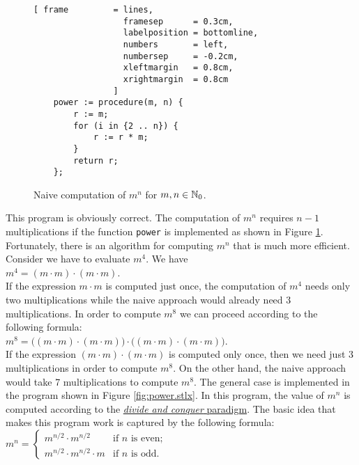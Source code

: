 \begin{figure}[!h]
  \centering
\begin{Verbatim}[ frame         = lines, 
                  framesep      = 0.3cm, 
                  labelposition = bottomline,
                  numbers       = left,
                  numbersep     = -0.2cm,
                  xleftmargin   = 0.8cm,
                  xrightmargin  = 0.8cm
                ]
    power := procedure(m, n) {
        r := m;
        for (i in {2 .. n}) {
            r := r * m;
        }
        return r;
    };
\end{Verbatim}
\vspace*{-0.3cm}
  \caption{Naive computation of $m^n$ for  $m,n \in {\mathbb N}_0$.}
  \label{fig:power-naive.stlx}
\end{figure} 

This program is obviously correct.  The computation of $m^n$ requires $n-1$ multiplications if the
function \texttt{power}  is implemented as shown in Figure \ref{fig:power-naive.stlx}.
Fortunately, there is an algorithm for computing $m^n$ that is much more efficient.
Consider we have to evaluate $m^4$.  We have
 \\[0.2cm]
\hspace*{1.3cm} 
$m^4 = (m \cdot m) \cdot (m \cdot m)$.
\\[0.2cm]
If the expression $m\cdot m$ is computed just once, the computation of
$m^4$ needs only two multiplications while the naive approach would already need 3 multiplications.
In order to compute $m^8$ we can proceed according to the following formula: \\[0.2cm]
\hspace*{1.3cm} 
$m^8 = \bigl( (m \cdot m) \cdot (m \cdot m) \bigr) \cdot \bigl( (m \cdot m) \cdot (m \cdot m)
\bigr)$. 
\\[0.2cm]
If the expression $(m \cdot m) \cdot (m \cdot m)$ is computed only once, then we need just 3 multiplications
in order to compute $m^8$.   On the other hand, the naive approach would take 7 multiplications to
compute $m^8$.  The general case is implemented in the program shown in Figure \ref{fig:power.stlx}.  
In this program, the value of $m^n$ is computed according to the 
\href{http://en.wikipedia.org/wiki/Divide_and_conquer_algorithm}{\emph{divide and conquer} paradigm}.
The basic idea that makes this program work is captured by the following formula: 
\\[0.2cm] 
\hspace*{1.3cm} 
$m^n = 
\left\{\begin{array}{ll}
m^{n/2} \cdot m^{n/2}          & \mbox{if $n$ is even};    \\
m^{n/2} \cdot m^{n/2} \cdot m  & \mbox{if $n$ is odd}.
\end{array}
\right.
$
\vspace*{0.3cm}


